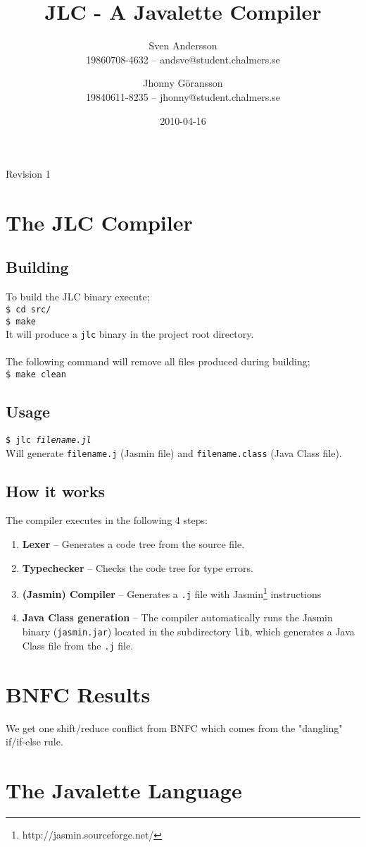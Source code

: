\documentclass[]{article}
\title{JLC - A Javalette Compiler}
\author{Sven Andersson\\19860708-4632 -- andsve@student.chalmers.se
        \and Jhonny Göransson\\19840611-8235 -- jhonny@student.chalmers.se}
\date{2010-04-16}
\begin{document}
\ifpdf
{}
\else
{}
\fi

\maketitle
\begin{center}
  Revision 1
\end{center}



\section{The JLC Compiler}
  \subsection*{Building}
    To build the JLC binary execute;\\
    \texttt{\$ cd src/}\\
    \texttt{\$ make}\\
    It will produce a \texttt{jlc} binary in the project root directory.\\
    \\
    The following command will remove all files produced during building;\\
    \texttt{\$ make clean}

  \subsection*{Usage}
    \texttt{\$ jlc \textit{filename.jl}}\\
    Will generate \texttt{filename.j} (Jasmin file) and \texttt{filename.class} (Java Class file).
  
  \subsection*{How it works}
    The compiler executes in the following 4 steps:
    \begin{enumerate}
      \item \textbf{Lexer} -- Generates a code tree from the source file.
      \item \textbf{Typechecker} -- Checks the code tree for type errors.
      \item \textbf{(Jasmin) Compiler} -- Generates a \texttt{.j} file with Jasmin\footnote{http://jasmin.sourceforge.net/} instructions
      \item \textbf{Java Class generation} -- The compiler automatically runs the Jasmin binary (\texttt{jasmin.jar}) located in the subdirectory \texttt{lib}, which generates a Java Class file from the \texttt{.j} file.
    \end{enumerate}

\section{BNFC Results}
  We get one shift/reduce conflict from BNFC which comes from the "dangling" if/if-else rule.

\section{The Javalette Language}




\end{document}

